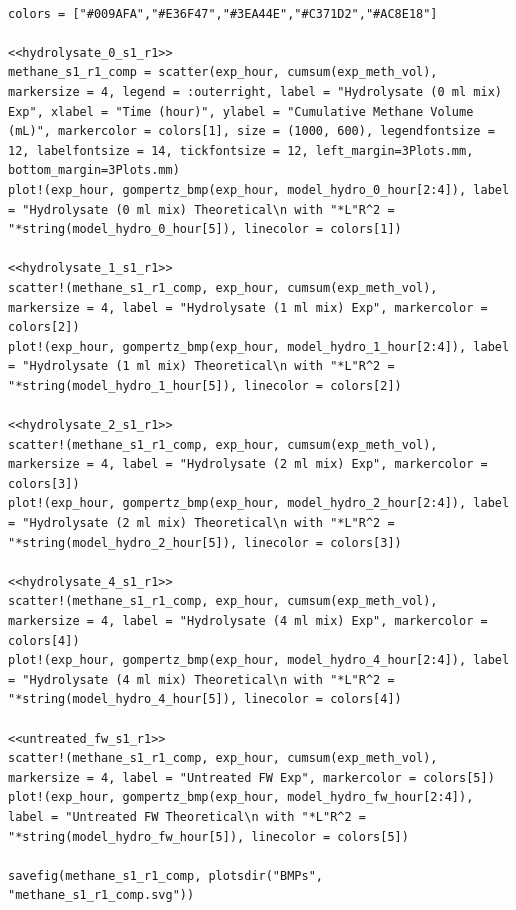 \documentclass[11pt]{article}
\begin{document}
\begin{verbatim}

colors = ["#009AFA","#E36F47","#3EA44E","#C371D2","#AC8E18"]

<<hydrolysate_0_s1_r1>>
methane_s1_r1_comp = scatter(exp_hour, cumsum(exp_meth_vol), markersize = 4, legend = :outerright, label = "Hydrolysate (0 ml mix) Exp", xlabel = "Time (hour)", ylabel = "Cumulative Methane Volume (mL)", markercolor = colors[1], size = (1000, 600), legendfontsize = 12, labelfontsize = 14, tickfontsize = 12, left_margin=3Plots.mm,  bottom_margin=3Plots.mm)
plot!(exp_hour, gompertz_bmp(exp_hour, model_hydro_0_hour[2:4]), label = "Hydrolysate (0 ml mix) Theoretical\n with "*L"R^2 = "*string(model_hydro_0_hour[5]), linecolor = colors[1])

<<hydrolysate_1_s1_r1>>
scatter!(methane_s1_r1_comp, exp_hour, cumsum(exp_meth_vol), markersize = 4, label = "Hydrolysate (1 ml mix) Exp", markercolor = colors[2])
plot!(exp_hour, gompertz_bmp(exp_hour, model_hydro_1_hour[2:4]), label = "Hydrolysate (1 ml mix) Theoretical\n with "*L"R^2 = "*string(model_hydro_1_hour[5]), linecolor = colors[2])

<<hydrolysate_2_s1_r1>>
scatter!(methane_s1_r1_comp, exp_hour, cumsum(exp_meth_vol), markersize = 4, label = "Hydrolysate (2 ml mix) Exp", markercolor = colors[3])
plot!(exp_hour, gompertz_bmp(exp_hour, model_hydro_2_hour[2:4]), label = "Hydrolysate (2 ml mix) Theoretical\n with "*L"R^2 = "*string(model_hydro_2_hour[5]), linecolor = colors[3])

<<hydrolysate_4_s1_r1>>
scatter!(methane_s1_r1_comp, exp_hour, cumsum(exp_meth_vol), markersize = 4, label = "Hydrolysate (4 ml mix) Exp", markercolor = colors[4])
plot!(exp_hour, gompertz_bmp(exp_hour, model_hydro_4_hour[2:4]), label = "Hydrolysate (4 ml mix) Theoretical\n with "*L"R^2 = "*string(model_hydro_4_hour[5]), linecolor = colors[4])

<<untreated_fw_s1_r1>>
scatter!(methane_s1_r1_comp, exp_hour, cumsum(exp_meth_vol), markersize = 4, label = "Untreated FW Exp", markercolor = colors[5])
plot!(exp_hour, gompertz_bmp(exp_hour, model_hydro_fw_hour[2:4]), label = "Untreated FW Theoretical\n with "*L"R^2 = "*string(model_hydro_fw_hour[5]), linecolor = colors[5])

savefig(methane_s1_r1_comp, plotsdir("BMPs", "methane_s1_r1_comp.svg"))
\end{verbatim}
\end{document}
